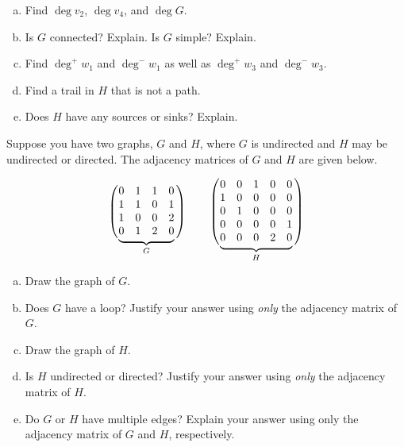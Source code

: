 \documentclass[11pt,letterpaper]{article}
\begin{document}
\begin{enumerate}[(a)]
\item Find $\deg v_2$, $\deg v_4$, and $\deg G$.
\item Is $G$ connected? Explain. Is $G$ simple? Explain.
\item Find $\deg^+ \!w_1$ and $\deg^- \!w_1$ as well as $\deg^+ \!w_3$ and $\deg^- \!w_3$. 
\item Find a trail in $H$ that is not a path. 
\item Does $H$ have any sources or sinks? Explain. 
\end{enumerate}



\newpage



 Suppose you have two graphs, $G$ and $H$, where $G$ is undirected and $H$ may be undirected or directed. The adjacency matrices of $G$ and $H$ are given below. \par
	\def\matrixG{%
	\begin{matrix}
	0 & 1 & 1 & 0 \\
	1 & 1 & 0 & 1 \\
	1 & 0 & 0 & 2 \\
	0 & 1 & 2 & 0 
	\end{matrix}
	}%
	\def\matrixH{%
	\begin{matrix}
	0 & 0 & 1 & 0 & 0 \\
	1 & 0 & 0 & 0 & 0 \\
	0 & 1 & 0 & 0 & 0 \\
	0 & 0 & 0 & 0 & 1 \\
	0 & 0 & 0 & 2 & 0 
	\end{matrix}
	}%
	\[
	\left(\vphantom{\matrixG} \right.\kern-2\nulldelimiterspace
  \underbrace{\matrixG}_{G} \kern-\nulldelimiterspace\left.\vphantom{\matrixG} \right) \qquad
  	\left(\vphantom{\matrixH} \right.\kern-2\nulldelimiterspace
  \underbrace{\matrixH}_{H} \kern-\nulldelimiterspace\left.\vphantom{\matrixH} \right)
	\]

\begin{enumerate}[(a)]
\item Draw the graph of $G$.
\item Does $G$ have a loop? Justify your answer using \textit{only} the adjacency matrix of $G$.
\item Draw the graph of $H$.
\item Is $H$ undirected or directed? Justify your answer using \textit{only} the adjacency matrix of $H$.
\item Do $G$ or $H$ have multiple edges? Explain your answer using only the adjacency matrix of $G$ and $H$, respectively. 
\end{enumerate}
\end{document}
